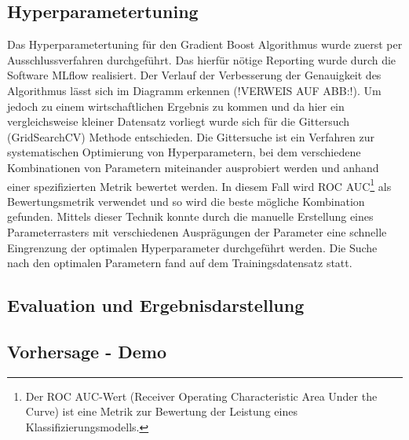 \documentclass{article}
\begin{document}
\subsection{Hyperparametertuning}
Das Hyperparametertuning für den Gradient Boost Algorithmus wurde zuerst per Ausschlussverfahren durchgeführt. Das hierfür nötige Reporting wurde durch die Software MLflow realisiert. Der Verlauf der Verbesserung der Genauigkeit des Algorithmus lässt sich im Diagramm erkennen (!VERWEIS AUF ABB:!). Um jedoch zu einem wirtschaftlichen Ergebnis zu kommen und da hier ein vergleichsweise kleiner Datensatz vorliegt wurde sich für die Gittersuch (GridSearchCV) Methode entschieden. Die Gittersuche ist ein Verfahren zur systematischen Optimierung von Hyperparametern, bei dem verschiedene Kombinationen von Parametern miteinander ausprobiert werden und anhand einer spezifizierten Metrik bewertet werden. In diesem Fall wird ROC AUC\footnote{Der ROC AUC-Wert (Receiver Operating Characteristic Area Under the Curve) ist eine Metrik zur Bewertung der Leistung eines Klassifizierungsmodells.} als Bewertungsmetrik verwendet und so wird die beste mögliche Kombination gefunden. Mittels dieser Technik konnte durch die manuelle Erstellung eines Parameterrasters mit verschiedenen Ausprägungen der Parameter eine schnelle Eingrenzung der optimalen Hyperparameter durchgeführt werden. Die Suche nach den optimalen Parametern fand auf dem Trainingsdatensatz statt. 
\subsection{Evaluation und Ergebnisdarstellung}

\subsection{Vorhersage - Demo}
\end{document}
